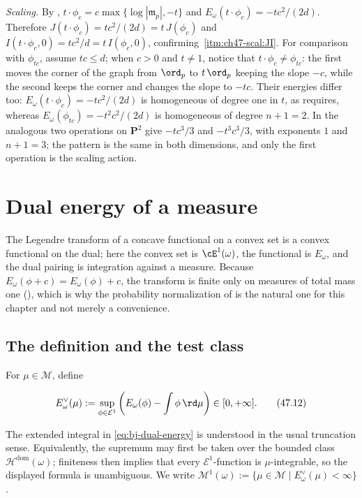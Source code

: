 \begin{example}
\emph{Scaling.}  By ,
$t\cdot\phi_c=c\max\{\log|\mathfrak m_p|,-t\}$ and
$E_\omega(t\cdot\phi_c)=-tc^2/(2d)$.  Therefore
$J(t\cdot\phi_c)=tc^2/(2d)=t\,J(\phi_c)$ and
$I(t\cdot\phi_c,0)=tc^2/d=t\,I(\phi_c,0)$, confirming
\,\cref{itm:ch47-scal:JI}.
For comparison with $\phi_{tc}$, assume $tc\le d$; when $c>0$ and
$t\ne1$, notice that $t\cdot\phi_c\ne\phi_{tc}$: the first moves the corner of the graph from
$\ord_p$ to $t\,\ord_p$ keeping the slope $-c$, while the second
keeps the corner and changes the slope to $-tc$.  Their energies differ
too: $E_\omega(t\cdot\phi_c)=-tc^2/(2d)$ is homogeneous of degree one in
$t$, as  requires, whereas
$E_\omega(\phi_{tc})=-t^2c^2/(2d)$ is homogeneous of degree $n+1=2$.  In
 the analogous two operations on $\mathbf P^2$
give $-tc^3/3$ and $-t^3c^3/3$, with exponents $1$ and $n+1=3$; the
pattern is the same in both dimensions, and only the first operation is the
scaling action.
\end{example}

\section{Dual energy of a measure}
\label{sec:ch47-dual}

The Legendre transform of a concave functional on a convex set is a convex
functional on the dual; here the convex set is $\cE^1(\omega)$, the
functional is $E_\omega$, and the dual pairing is integration against a
measure.  Because $E_\omega(\phi+c)=E_\omega(\phi)+c$, the transform is
finite only on measures of total mass one
(), which is why the probability normalization
of  is the natural one for this chapter and
not merely a convenience.

\subsection{The definition and the test class}
\label{sec:ch47-dual-def}

\begin{definition}
\label{def:bj-finite-energy-measure}
For $\mu\in\mathcal M$, define

\[
 E_\omega^\vee(\mu)
 :=\sup_{\phi\in\mathcal E^1}
       \left(E_\omega(\phi)-\int\phi\,\rd \mu\right)
 \in[0,+\infty].
\tag{47.12}\label{eq:bj-dual-energy}
\]

The extended integral in \eqref{eq:bj-dual-energy} is understood in the
usual truncation sense.  Equivalently, the supremum may first be taken over
the bounded class $\mathcal H^{\mathrm{dom}}(\omega)$; finiteness then
implies that every $\mathcal E^1$-function is $\mu$-integrable, so the
displayed formula is unambiguous.
We write
$\mathcal M^1(\omega):=\{\mu\in\mathcal M\mid E_\omega^\vee(\mu)<\infty\}$.
\end{definition}

